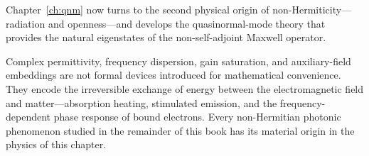 Chapter~\ref{ch:qnm} now turns to the second physical origin of
non-Hermiticity---radiation and openness---and develops the quasinormal-mode
theory that provides the natural eigenstates of the non-self-adjoint
Maxwell operator.

\begin{takeaway}
Complex permittivity, frequency dispersion, gain saturation, and
auxiliary-field embeddings are not formal devices introduced for
mathematical convenience. They encode the irreversible exchange of
energy between the electromagnetic field and matter---absorption heating,
stimulated emission, and the frequency-dependent phase response of bound
electrons. Every non-Hermitian photonic phenomenon studied in the
remainder of this book has its material origin in the physics of this
chapter.
\end{takeaway}

